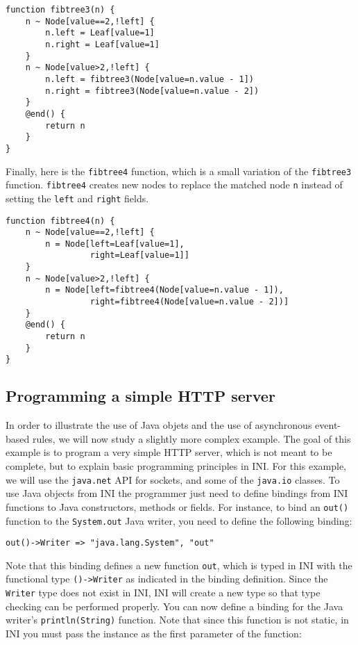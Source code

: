 \documentclass[11pt]{article}
\begin{document}
\begin{lstlisting}
function fibtree3(n) {
	n ~ Node[value==2,!left] {
		n.left = Leaf[value=1]
		n.right = Leaf[value=1]
	}
	n ~ Node[value>2,!left] {
		n.left = fibtree3(Node[value=n.value - 1])
		n.right = fibtree3(Node[value=n.value - 2])
	}
	@end() {
		return n
	}
}
\end{lstlisting}

Finally, here is the \texttt{fibtree4} function, which is a small variation of the \texttt{fibtree3} function. \texttt{fibtree4} creates new nodes to replace the matched node \texttt{n} instead of setting the \texttt{left} and \texttt{right} fields.

\begin{lstlisting}
function fibtree4(n) {
	n ~ Node[value==2,!left] {
		n = Node[left=Leaf[value=1],
		         right=Leaf[value=1]]
	}
	n ~ Node[value>2,!left] {
		n = Node[left=fibtree4(Node[value=n.value - 1]),
		         right=fibtree4(Node[value=n.value - 2])]
	}
	@end() {
		return n
	}
}
\end{lstlisting}

\subsection{Programming a simple HTTP server}

In order to illustrate the use of Java objets and the use of asynchronous event-based rules, we will now study a slightly more complex example. The goal of this example is to program a very simple HTTP server, which is not meant to be complete, but to explain basic programming principles in INI. For this example, we will use the \texttt{java.net} API for sockets, and some of the \texttt{java.io} classes. To use Java objects from INI the programmer just need to define bindings from INI functions to Java constructors, methods or fields. For instance, to bind an \texttt{out()} function to the \texttt{System.out} Java writer, you need to define the following binding:

\begin{lstlisting}[numbers=none]
out()->Writer => "java.lang.System", "out"
\end{lstlisting}

Note that this binding defines a new function \texttt{out}, which is typed in INI with the functional type \texttt{()->Writer} as indicated in the binding definition. Since the \texttt{Writer} type does not exist in INI, INI will create a new type so that type checking can be performed properly. You can now define a binding for the Java writer's \texttt{println(String)} function. Note that since this function is not static, in INI you must pass the instance as the first parameter of the function:
\end{document}
